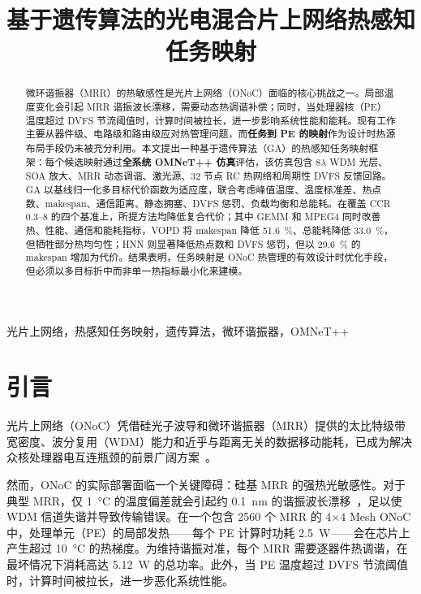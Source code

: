 \documentclass[conference]{IEEEtran}
\begin{document}
\title{基于遗传算法的光电混合片上网络热感知任务映射}

\author{
}

\maketitle

\begin{abstract}
微环谐振器（MRR）的热敏感性是光片上网络（ONoC）面临的核心挑战之一。局部温度变化会引起 MRR 谐振波长漂移，需要动态热调谐补偿；同时，当处理器核（PE）温度超过 DVFS 节流阈值时，计算时间被拉长，进一步影响系统性能和能耗。现有工作主要从器件级、电路级和路由级应对热管理问题，而\textbf{任务到 PE 的映射}作为设计时热源布局手段仍未被充分利用。本文提出一种基于遗传算法（GA）的热感知任务映射框架：每个候选映射通过\textbf{全系统 OMNeT++ 仿真}评估，该仿真包含 8$\lambda$ WDM 光层、SOA 放大、MRR 动态调谐、激光源、32 节点 RC 热网络和周期性 DVFS 反馈回路。GA 以基线归一化多目标代价函数为适应度，联合考虑峰值温度、温度标准差、热点数、makespan、通信距离、静态拥塞、DVFS 惩罚、负载均衡和总能耗。在覆盖 CCR 0.3--8 的四个基准上，所提方法均降低复合代价；其中 GEMM 和 MPEG4 同时改善热、性能、通信和能耗指标，VOPD 将 makespan 降低 \SI{51.6}{\percent}、总能耗降低 \SI{33.0}{\percent}，但牺牲部分热均匀性；HNN 则显著降低热点数和 DVFS 惩罚，但以 \SI{29.6}{\percent} 的 makespan 增加为代价。结果表明，任务映射是 ONoC 热管理的有效设计时优化手段，但必须以多目标折中而非单一热指标最小化来建模。
\end{abstract}

\begin{IEEEkeywords}
光片上网络，热感知任务映射，遗传算法，微环谐振器，OMNeT++
\end{IEEEkeywords}

\section{引言}

光片上网络（ONoC）凭借硅光子波导和微环谐振器（MRR）提供的太比特级带宽密度、波分复用（WDM）能力和近乎与距离无关的数据移动能耗，已成为解决众核处理器电互连瓶颈的前景广阔方案~\cite{batten2008,bergman2018}。

然而，ONoC 的实际部署面临一个关键障碍：硅基 MRR 的强热光敏感性。对于典型 MRR，仅 \SI{1}{\degreeCelsius} 的温度偏差就会引起约 \SI{0.1}{\nano\meter} 的谐振波长漂移~\cite{padmaraju2014}，足以使 WDM 信道失谐并导致传输错误。在一个包含 2560 个 MRR 的 4$\times$4 Mesh ONoC 中，处理单元（PE）的局部发热——每个 PE 计算时功耗 \SI{2.5}{\watt}——会在芯片上产生超过 \SI{10}{\degreeCelsius} 的热梯度。为维持谐振对准，每个 MRR 需要逐器件热调谐，在最坏情况下消耗高达 \SI{5.12}{\watt} 的总功率。此外，当 PE 温度超过 DVFS 节流阈值时，计算时间被拉长，进一步恶化系统性能。
\end{document}
